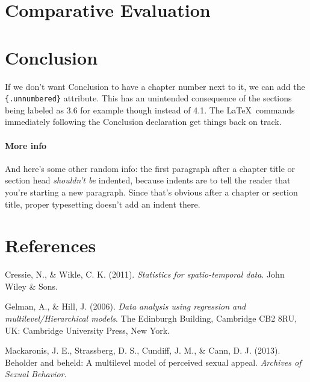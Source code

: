 \documentclass[12pt,twoside]{reedthesis}
\begin{document}
  \chapter{Comparative Evaluation}\label{comparative-evaluation}
  
  \chapter*{Conclusion}\label{conclusion}
  
  \setcounter{chapter}{4} \setcounter{section}{0}
  
  If we don't want Conclusion to have a chapter number next to it, we can
  add the \texttt{\{.unnumbered\}} attribute. This has an unintended
  consequence of the sections being labeled as 3.6 for example though
  instead of 4.1. The \LaTeX~commands immediately following the Conclusion
  declaration get things back on track.
  
  \subsubsection{More info}\label{more-info}
  
  And here's some other random info: the first paragraph after a chapter
  title or section head \emph{shouldn't be} indented, because indents are
  to tell the reader that you're starting a new paragraph. Since that's
  obvious after a chapter or section title, proper typesetting doesn't add
  an indent there.
  
  \backmatter
  
  \chapter{References}\label{references}
  
  \noindent
  
  \setlength{\parindent}{-0.20in} \setlength{\leftskip}{0.20in}
  \setlength{\parskip}{8pt}
  
  Cressie, N., \& Wikle, C. K. (2011). \emph{Statistics for
  spatio-temporal data}. John Wiley \& Sons.
  
  Gelman, A., \& Hill, J. (2006). \emph{Data analysis using regression and
  multilevel/Hierarchical models}. The Edinburgh Building, Cambridge CB2
  8RU, UK: Cambridge University Press, New York.
  
  Mackaronis, J. E., Strassberg, D. S., Cundiff, J. M., \& Cann, D. J.
  (2013). Beholder and beheld: A multilevel model of perceived sexual
  appeal. \emph{Archives of Sexual Behavior}.


\end{document}

